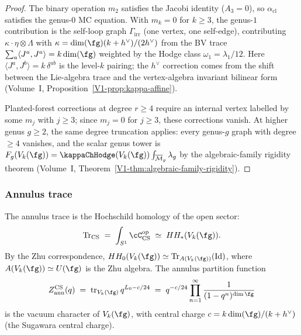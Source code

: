 \begin{proof}
The binary operation $m_2$ satisfies the Jacobi identity ($A_3 = 0$), so $\alpha_{\mathrm{cl}}$ satisfies the genus-$0$ MC equation. With $m_k = 0$ for $k \ge 3$, the genus-$1$ contribution is the self-loop graph $\Gamma_{\mathrm{irr}}$ (one vertex, one self-edge), contributing $\kappa \cdot \eta \otimes \Lambda$ with $\kappa = \dim(\fg)(k + h^\vee)/(2h^\vee)$ from the BV trace $\sum_a \langle J^a, J^a \rangle = k\dim(\fg)$ weighted by the Hodge class $\omega_1 = \lambda_1/12$. Here $\langle J^a, J^b \rangle = k\,\delta^{ab}$ is the level-$k$ pairing; the $h^\vee$ correction comes from the shift between the Lie-algebra trace and the vertex-algebra invariant bilinear form (Volume~I, Proposition~\ref*{V1-prop:kappa-affine}).

Planted-forest corrections at degree $r \ge 4$ require an internal vertex labelled by some $m_j$ with $j \ge 3$; since $m_j = 0$ for $j \ge 3$, these corrections vanish. At higher genus $g \ge 2$, the same degree truncation applies: every genus-$g$ graph with degree $\ge 4$ vanishes, and the scalar genus tower is $F_g(V_k(\fg)) = \kappaChHodge(V_k(\fg)) \int_{\overline{\mathcal{M}}_g} \lambda_g$ by the algebraic-family rigidity theorem (Volume~I, Theorem~\ref*{V1-thm:algebraic-family-rigidity}).
\end{proof}

\subsubsection*{Annulus trace}

The annulus trace is the Hochschild homology of the open
sector:
\begin{equation}\label{eq:cs-annulus-trace}
\operatorname{Tr}_{\mathrm{CS}}
\;=\;
\int_{S^1} \cC_{\mathrm{CS}}^{\mathrm{op}}
\;\simeq\;
HH_*(V_k(\fg)).
\end{equation}
By the Zhu correspondence, $HH_0(V_k(\fg)) \simeq
\operatorname{Tr}_{A(V_k(\fg))}(\operatorname{Id})$,
where $A(V_k(\fg)) \simeq U(\fg)$ is the Zhu algebra.
The annulus partition function
\begin{equation}\label{eq:cs-annulus-partition}
Z_{\mathrm{ann}}^{\mathrm{CS}}(q)
\;=\;
\operatorname{tr}_{V_k(\fg)} q^{L_0 - c/24}
\;=\;
q^{-c/24} \prod_{n=1}^{\infty} \frac{1}{(1-q^n)^{\dim\fg}}
\end{equation}
is the vacuum character of $V_k(\fg)$, with central charge
$c = k\dim(\fg)/(k + h^\vee)$ (the Sugawara central charge).

